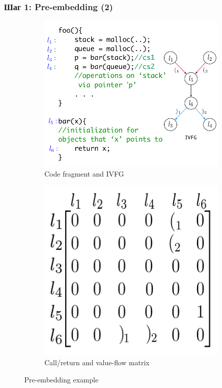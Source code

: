 \documentclass[xcolor=table,english]{beamer}
\begin{document}
\begin{frame}[fragile] \frametitle{Шаг 1: Pre-embedding (2)}
    \begin{figure}
        \centering
        \begin{subfigure}[b]{0.45\textwidth}
            \includegraphics[width=\textwidth]{figures/pre_embeding_a.png}
            \caption{Code fragment and IVFG}
        \end{subfigure}
        \hfill
        \begin{subfigure}[b]{0.45\textwidth}
            \includegraphics[width=\textwidth]{figures/pre_embedding_b.png}
            \caption{Call/return and value-flow matrix}
        \end{subfigure}
        \caption{Pre-embedding example}
    \end{figure}
\end{frame}
\end{document}
